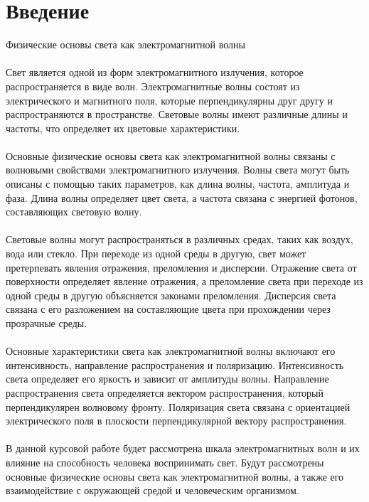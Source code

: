 \documentclass{article}
\begin{document}
\section{Введение}
Физические основы света как электромагнитной волны\\
~\\
Свет является одной из форм электромагнитного излучения, которое распространяется в виде волн. Электромагнитные волны состоят из электрического и магнитного поля, которые перпендикулярны друг другу и распространяются в пространстве. Световые волны имеют различные длины и частоты, что определяет их цветовые характеристики.\\
~\\
Основные физические основы света как электромагнитной волны связаны с волновыми свойствами электромагнитного излучения. Волны света могут быть описаны с помощью таких параметров, как длина волны, частота, амплитуда и фаза. Длина волны определяет цвет света, а частота связана с энергией фотонов, составляющих световую волну.\\
~\\
Световые волны могут распространяться в различных средах, таких как воздух, вода или стекло. При переходе из одной среды в другую, свет может претерпевать явления отражения, преломления и дисперсии. Отражение света от поверхности определяет явление отражения, а преломление света при переходе из одной среды в другую объясняется законами преломления. Дисперсия света связана с его разложением на составляющие цвета при прохождении через прозрачные среды.\\
~\\
Основные характеристики света как электромагнитной волны включают его интенсивность, направление распространения и поляризацию. Интенсивность света определяет его яркость и зависит от амплитуды волны. Направление распространения света определяется вектором распространения, который перпендикулярен волновому фронту. Поляризация света связана с ориентацией электрического поля в плоскости перпендикулярной вектору распространения.\\
~\\
В данной курсовой работе будет рассмотрена шкала электромагнитных волн и их влияние на способность человека воспринимать свет. Будут рассмотрены основные физические основы света как электромагнитной волны, а также его взаимодействие с окружающей средой и человеческим организмом.\\
~\\
\end{document}
